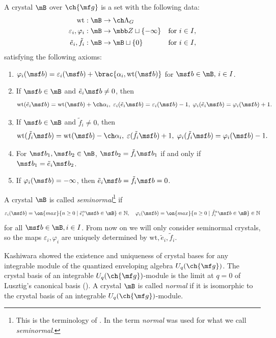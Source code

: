\documentclass[final]{amsart}
\theoremstyle{remark}
\theoremstyle{definition}
\numberwithin{equation}{section}
\begin{document}
A crystal $\mB$ over $\ch{\mf g}$ is a set with the following data: 
\begin{align*}
\mathrm{wt} &: \mB \to \ch\Lambda_G \\
\varepsilon_i, \varphi_i &: \mB \to \mbb Z \sqcup \{ -\infty \} &\text{for } i\in I, \\
\tilde e_i, \tilde f_i &: \mB \to \mB \sqcup \{0\} &\text{for } i\in I,
\end{align*}
satisfying the following axioms:
\begin{enumerate}[label={(\arabic*)}] 
\item $\varphi_i(\msf b) = \varepsilon_i(\msf b) + \brac{ \alpha_i, \mathrm{wt}(\msf b)}$
for $\msf b \in \mB,\, i\in I$.
\item If $\msf b \in \mB$ and $\tilde e_i \msf b \ne 0$, then 
\[ \mathrm{wt}(\tilde e_i \msf b) = \mathrm{wt}(\msf b) + \ch\alpha_i,\; 
\varepsilon_i( \tilde e_i \msf b) = \varepsilon_i(\msf b) -1,\; 
\varphi_i( \tilde e_i \msf b) = \varphi_i( \msf b ) + 1. \]
\item If $\msf b \in \mB$ and $\tilde f_i \ne 0$, then 
\[ \mathrm{wt}(\tilde f_i \msf b) = \mathrm{wt}(\msf b) - \ch\alpha_i,\;
\varepsilon(\tilde f_i \msf b) + 1,\; 
\varphi_i(\tilde f_i \msf b) = \varphi_i(\msf b) -1. 
\]
\item For $\msf b_1, \msf b_2 \in  \mB$, $\msf b_2 = \tilde f_i \msf b_1$ if and only if 
$\msf b_1 = \tilde e_i \msf b_2$.
\item If $\varphi_i(\msf b)=-\infty$, then $\tilde e_i \msf b = \tilde f_i \msf b = 0$. 
\end{enumerate}

A crystal $\mB$ is called \emph{seminormal}\footnote{This is the terminology of \cite{Kas94,Kas95}. In \cite{Kas93} the term \emph{normal} was used for what we call \emph{seminormal}.} 
if 
\[ \varepsilon_i(\msf b) = \on{max} \{ n \ge 0 \mid \tilde e_i^n \msf b \in \mB \} \in \mathbb N, 
\quad \varphi_i(\msf b) = \on{max} \{ n \ge 0 \mid \tilde f_i^n \msf b \in \mB \} \in \mathbb N 
\]
for all $\msf b\in \mB, i\in I$.
From now on we will only consider seminormal crystals, so the maps $\varepsilon_i, \varphi_i$
are uniquely determined by $\mathrm{wt}, \tilde e_i, \tilde f_i$. 

Kashiwara showed the existence and uniqueness of crystal bases for any integrable module of the
quantized enveloping algebra $U_q(\ch{\mf g})$. 
The crystal basis of an integrable $U_q(\ch{\mf g})$-module 
is the limit at $q=0$ of Lusztig's canonical basis 
(\cite{Lusztig90, Grojnowski-Lusztig}).
A crystal $\mB$ is called \emph{normal} if it is isomorphic to the crystal basis 
of an integrable $U_q(\ch{\mf g})$-module. 
\end{document}
